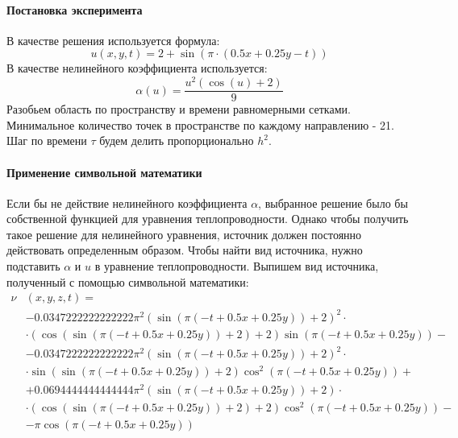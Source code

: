 \paragraph{Постановка эксперимента}
В качестве решения используется формула:
\begin{equation}
u(x, y, t) = 2 + \sin \left(\pi \cdot \left( 0.5x + 0.25y - t\right) \right)
\end{equation}
В качестве нелинейного коэффициента используется:
\begin{equation}
\alpha(u) = \frac{u^{2} \left(\cos{\left(u \right)} + 2\right)}{9}
\end{equation}
Разобьем область по пространству и времени равномерными сетками. Минимальное количество точек в пространстве по каждому направлению - 21. Шаг по времени $\tau$ будем делить пропорционально $h^2$.

\paragraph{Применение символьной математики}
Если бы не действие нелинейного коэффициента $\alpha$, выбранное решение было бы собственной функцией для уравнения теплопроводности. Однако чтобы получить такое решение для нелинейного уравнения, источник должен постоянно действовать определенным образом. Чтобы найти вид источника, нужно подставить $\alpha$ и $u$ в уравнение теплопроводности. Выпишем вид источника, полученный с помощью символьной математики:
\begin{equation}
\begin{split}
\nu & (x, y, z, t) = 
\\ 
&- 0.0347222222222222 \pi^{2} \left(\sin{\left(\pi \left(- t + 0.5 x + 0.25 y\right) \right)} + 2\right)^{2}  \cdot 
\\ 
& \cdot \left(\cos{\left(\sin{\left(\pi \left(- t + 0.5 x + 0.25 y\right) \right)} + 2 \right)} + 2\right) \sin{\left(\pi \left(- t + 0.5 x + 0.25 y\right) \right)} -
\\
& -0.0347222222222222 \pi^{2} \left(\sin{\left(\pi \left(- t + 0.5 x + 0.25 y\right) \right)} + 2\right)^{2} \cdot 
\\
& \cdot  \sin{\left(\sin{\left(\pi \left(- t + 0.5 x + 0.25 y\right) \right)} + 2 \right)} \cos^{2}{\left(\pi \left(- t + 0.5 x + 0.25 y\right) \right)} +
\\
& + 0.0694444444444444 \pi^{2} \left(\sin{\left(\pi \left(- t + 0.5 x + 0.25 y\right) \right)} + 2\right)  \cdot
\\
& \cdot \left(\cos{\left(\sin{\left(\pi \left(- t + 0.5 x + 0.25 y\right) \right)} + 2 \right)} + 2\right) \cos^{2}{\left(\pi \left(- t + 0.5 x + 0.25 y\right) \right)} -
\\
& - \pi \cos{\left(\pi \left(- t + 0.5 x + 0.25 y\right) \right)}
\end{split}
\end{equation}

